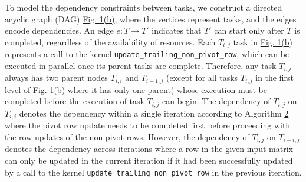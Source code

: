 

To model the dependency constraints between tasks, we construct a directed acyclic graph (DAG) \hyperref[fig:task_graph]{Fig. 1(b)}, where the vertices represent tasks, and the edges encode dependencies. An edge $e: T \rightarrow T '$ indicates that $ T '$ can start only after $ T $ is completed, regardless of the availability of resources. Each $T_{i,j}$ task in \hyperref[fig:task_graph]{Fig. 1(b)} represents a call to the kernel \texttt{update\_trailing\_non\_pivot\_row}, which can be executed in parallel once its parent tasks are complete. Therefore, any task $T_{i,j}$ always has two parent nodes $T_{i,i}$ and $T_{i-1,j}$ (except for all tasks $T_{i,j}$ in the first level of \hyperref[fig:task_graph]{Fig. 1(b)} where it has only one parent) whose execution must be completed before the execution of task $T_{i,j}$ can begin. The dependency of $T_{i,j}$ on $T_{i,i}$ denotes the dependency within a single iteration according to Algorithm \hyperref[alg:alg_inplace_qr]{2} where the pivot row update needs to be completed first before proceeding with the row updates of the non-pivot rows. However, the dependency of $T_{i,j}$ on $T_{i-i,j}$ denotes the dependency across iterations where a row in the given input matrix can only be updated in the current iteration if it had been successfully updated by a call to the kernel \texttt{update\_trailing\_non\_pivot\_row} in the previous iteration.

